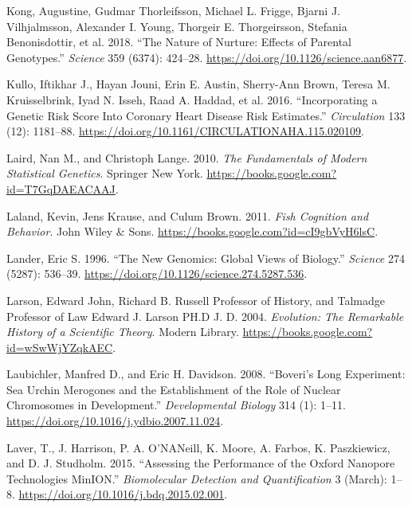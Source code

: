 \documentclass[
]{book}
\newlength{\cslhangindent}
\newlength{\cslentryspacingunit} %
\newenvironment{CSLReferences}[2] %
 {%
  \setlength{\parindent}{0pt}
  \ifodd #1
  \let\oldpar\par
  \def\par{\hangindent=\cslhangindent\oldpar}
  \fi
  \setlength{\parskip}{#2\cslentryspacingunit}
 }%
 {}
\begin{document}
\begin{CSLReferences}{1}{0}
\leavevmode{}%
Kong, Augustine, Gudmar Thorleifsson, Michael L. Frigge, Bjarni J. Vilhjalmsson, Alexander I. Young, Thorgeir E. Thorgeirsson, Stefania Benonisdottir, et al. 2018. {``The Nature of Nurture: {Effects} of Parental Genotypes.''} \emph{Science} 359 (6374): 424--28. \url{https://doi.org/10.1126/science.aan6877}.

\leavevmode{}%
Kullo, Iftikhar J., Hayan Jouni, Erin E. Austin, Sherry-Ann Brown, Teresa M. Kruisselbrink, Iyad N. Isseh, Raad A. Haddad, et al. 2016. {``Incorporating a {Genetic Risk Score Into Coronary Heart Disease Risk Estimates}.''} \emph{Circulation} 133 (12): 1181--88. \url{https://doi.org/10.1161/CIRCULATIONAHA.115.020109}.

\leavevmode{}%
Laird, Nan M., and Christoph Lange. 2010. \emph{The {Fundamentals} of {Modern Statistical Genetics}}. {Springer New York}. \url{https://books.google.com?id=T7GqDAEACAAJ}.

\leavevmode{}%
Laland, Kevin, Jens Krause, and Culum Brown. 2011. \emph{Fish {Cognition} and {Behavior}}. {John Wiley \& Sons}. \url{https://books.google.com?id=cI9gbVyH6lsC}.

\leavevmode{}%
Lander, Eric S. 1996. {``The {New Genomics}: {Global Views} of {Biology}.''} \emph{Science} 274 (5287): 536--39. \url{https://doi.org/10.1126/science.274.5287.536}.

\leavevmode{}%
Larson, Edward John, Richard B. Russell Professor of History, and Talmadge Professor of Law Edward J. Larson PH.D J. D. 2004. \emph{Evolution: {The Remarkable History} of a {Scientific Theory}}. {Modern Library}. \url{https://books.google.com?id=wSwWjYZqkAEC}.

\leavevmode{}%
Laubichler, Manfred D., and Eric H. Davidson. 2008. {``Boveri's Long Experiment: {Sea} Urchin Merogones and the Establishment of the Role of Nuclear Chromosomes in Development.''} \emph{Developmental Biology} 314 (1): 1--11. \url{https://doi.org/10.1016/j.ydbio.2007.11.024}.

\leavevmode{}%
Laver, T., J. Harrison, P. A. O'NANeill, K. Moore, A. Farbos, K. Paszkiewicz, and D. J. Studholm. 2015. {``Assessing the Performance of the {Oxford Nanopore Technologies MinION}.''} \emph{Biomolecular Detection and Quantification} 3 (March): 1--8. \url{https://doi.org/10.1016/j.bdq.2015.02.001}.


\end{CSLReferences}
\end{document}
